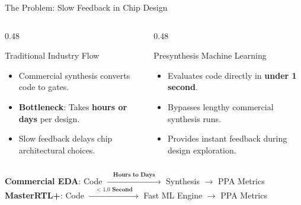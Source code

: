 \documentclass[aspectratio=169,10pt]{beamer}
\begin{document}
\begin{frame}{The Problem: Slow Feedback in Chip Design}
    \vspace{0.1cm}
    \begin{columns}[T]
        \begin{column}{0.48\textwidth}
            \begin{block}{\centering Traditional Industry Flow}
                \footnotesize
                \begin{itemize}
                    \item Commercial synthesis converts code to gates.
                    \item \textbf{Bottleneck}: Takes \textbf{hours or days} per design.
                    \item Slow feedback delays chip architectural choices.
                \end{itemize}
            \end{block}
        \end{column}
        \begin{column}{0.48\textwidth}
            \begin{block}{\centering Presynthesis Machine Learning}
                \footnotesize
                \begin{itemize}
                    \item Evaluates code directly in \textbf{under 1 second}.
                    \item Bypasses lengthy commercial synthesis runs.
                    \item Provides instant feedback during design exploration.
                \end{itemize}
            \end{block}
        \end{column}
    \end{columns}
    \vfill
    \begin{center}
        \small
        \textbf{Commercial EDA}: Code $\xrightarrow{\quad\textbf{Hours to Days}\quad}$ Synthesis $\to$ PPA Metrics\\
        \textbf{MasterRTL+}: Code $\xrightarrow{\quad\mathbf{< 1.0\textbf{ Second}}\quad}$ Fast ML Engine $\to$ PPA Metrics
    \end{center}
\end{frame}
\end{document}
